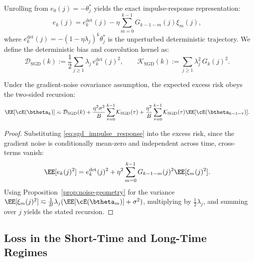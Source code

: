 Unrolling from $e_0(j) = -\theta_j^*$ yields the exact impulse-response representation:
\begin{equation} \label{eq:sgd_impulse_response}
    e_k(j)
    =
    e_k^{\mathrm{det}}(j)
    -
    \eta\sum_{m=0}^{k-1}G_{k-1-m}(j)\xi_m(j),
\end{equation}
where $e_k^{\mathrm{det}}(j) = -(1-\eta\lambda_j)^k \theta_j^*$ is the unperturbed deterministic trajectory. We define the deterministic bias and convolution kernel as:
\[
    \mathcal D_{\mathrm{SGD}}(k) := \frac{1}{2}\sum_{j\ge1}\lambda_j\,e_k^{\mathrm{det}}(j)^2,
    \qquad
    \mathcal K_{\mathrm{SGD}}(k) := \sum_{j\ge1}\lambda_j^2\,G_k(j)^2.
\]

\begin{proposition}
\label{prop:sgd_risk_recursion}
Under the gradient-noise covariance assumption, the expected excess risk obeys the two-sided recursion:
\begin{equation} \label{eq:sgd_risk_recursion_form}
    \EE[\cE(\btheta_k)]
    \eqsim
    \mathcal{D}_{\mathrm{SGD}}(k)
    +
    \frac{\eta^2\sigma^2}{B}\sum_{\tau=0}^{k-1}\mathcal{K}_{\mathrm{SGD}}(\tau)
    +
    \frac{\eta^2}{B}\sum_{\tau=0}^{k-1}\mathcal{K}_{\mathrm{SGD}}(\tau)\EE[\cE(\btheta_{k-1-\tau})].
\end{equation}
\end{proposition}
\begin{proof}
Substituting \eqref{eq:sgd_impulse_response} into the excess risk, since the gradient noise is conditionally mean-zero and independent across time, cross-terms vanish:
\[
    \EE[e_k(j)^2]
    =
    e_k^{\mathrm{det}}(j)^2
    +
    \eta^2\sum_{m=0}^{k-1}G_{k-1-m}(j)^2\EE[\xi_m(j)^2].
\]
Using Proposition~\ref{prop:noise-geometry} for the variance $\EE[\xi_m(j)^2] \eqsim \frac{1}{B}\lambda_j(\EE[\cE(\btheta_m)] + \sigma^2)$, multiplying by $\frac{1}{2}\lambda_j$, and summing over $j$ yields the stated recursion. 
\end{proof}

\subsection{Loss in the Short-Time and Long-Time Regimes}
\label{app:sgd_bias_kernel}

